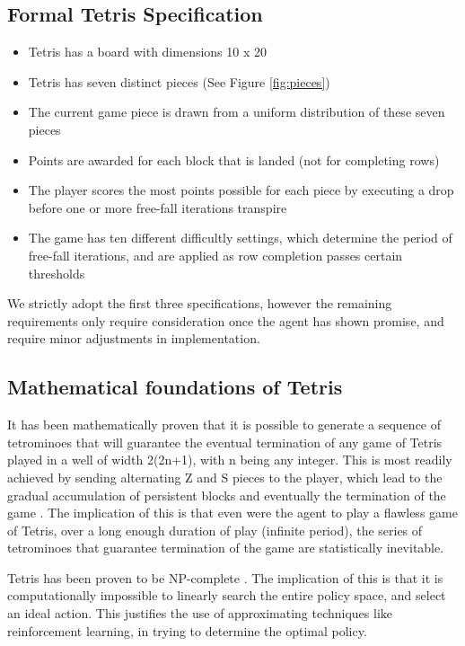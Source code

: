 \documentclass{rucsthesis}
\begin{document}
\subsection*{Formal Tetris Specification \citep{tetstand}} 
\begin{itemize}
\item{Tetris has a board with dimensions 10 x 20}
\item{Tetris has seven distinct pieces (See Figure \ref{fig:pieces})}
\item{The current game piece is drawn from a uniform distribution of these seven pieces}
\item{Points are awarded for each block that is landed (not for completing rows)}
\item{The player scores the most points possible for each piece by executing a drop before one or more free-fall iterations transpire}
\item{The game has ten different difficultly settings, which determine the period of free-fall iterations, and are applied as row completion passes certain thresholds}
\end{itemize}

We strictly adopt the first three specifications, however the remaining requirements only require consideration once the agent has shown promise, and require minor adjustments in implementation. 

\subsection{Mathematical foundations of Tetris}

It has been mathematically proven \citep{mathproof,losetetris} that it is possible to generate a sequence of tetrominoes that will guarantee the eventual termination of any game of Tetris played in a well of width 2(2n+1), with n being any integer. This is most readily achieved by sending alternating Z and S pieces to the player, which lead to the gradual accumulation of persistent blocks and eventually the termination of the game \citep[Chpt. 5]{mathproof}. The implication of this is that even were the agent to play a flawless game of Tetris, over a long enough duration of play (infinite period), the series of tetrominoes that guarantee termination of the game are statistically inevitable.

Tetris has been proven to be NP-complete \citep{hardtet}. The implication of this is that it is computationally impossible to linearly search the entire policy space, and select an ideal action. This justifies the use of approximating techniques like reinforcement learning, in trying to determine the optimal policy.
\end{document}
